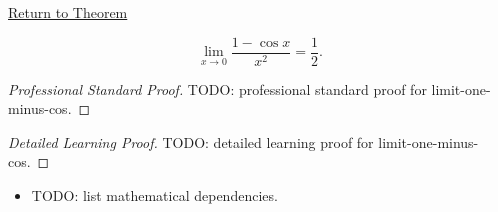 \newpage
{}
\label{prf:limit-one-minus-cos}

\begin{remark*}[Return]
\hyperref[prop:limit-one-minus-cos]{Return to Theorem}
\end{remark*}

\begin{proposition*}
\[
  \lim_{x \to 0} \frac{1 - \cos x}{x^2} = \frac{1}{2}.
\]

\smallskip\noindent
\end{proposition*}

\begin{proof}[Professional Standard Proof]
\LRAProofBodyStart
TODO: professional standard proof for limit-one-minus-cos.
\end{proof}

\begin{proof}[Detailed Learning Proof]
\LRAProofBodyStart
TODO: detailed learning proof for limit-one-minus-cos.
\end{proof}

\begin{remark*}
\end{remark*}

\begin{dependencies}
\begin{itemize}
  \item TODO: list mathematical dependencies.
\end{itemize}
\end{dependencies}

\clearpage
